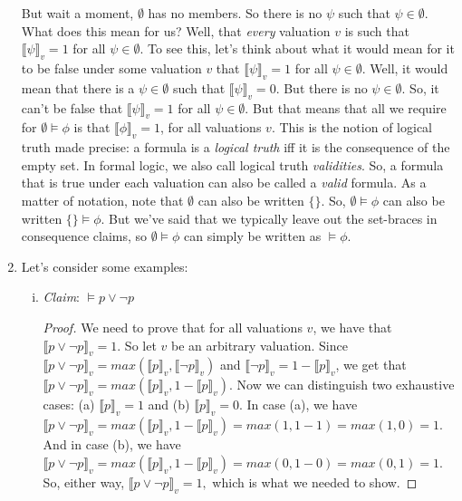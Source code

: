 \begin{enumerate}[\thesection.1]
\begin{itemize}
	\end{itemize}
But wait a moment, $\emptyset$ has no members. So there is no $\psi$ such that $\psi\in \emptyset$. What does this mean for us? Well, that \emph{every} valuation $v$ is such that $\llbracket\psi\rrbracket_v=1$ for all $\psi\in\emptyset$. To see this, let's think about what it would mean for it to be false under some valuation $v$ that $\llbracket\psi\rrbracket_v=1$ for all $\psi\in\emptyset$. Well, it would mean that there is a $\psi\in\emptyset$ such that $\llbracket\psi\rrbracket_v=0$. But there is no $\psi\in\emptyset$. So, it can't be false that $\llbracket\psi\rrbracket_v=1$ for all $\psi\in\emptyset$. But that means that all we require for $\emptyset\vDash\phi$ is that $\llbracket\phi\rrbracket_v=1$, for all valuations $v$. This is the notion of logical truth made precise: a formula is a \emph{logical truth} iff it is the consequence of the empty set. In formal logic, we also call logical truth \emph{validities}. So, a formula that is true under each valuation can also be called a \emph{valid} formula. As a matter of notation, note that $\emptyset$ can also be written $\{\}$. So, $\emptyset\vDash\phi$ can also be written $\{\}\vDash\phi$. But we've said that we typically leave out the set-braces in consequence claims, so $\emptyset\vDash\phi$ can simply be written as $\vDash\phi$.

	\item Let's consider some examples:
		
		\begin{enumerate}[(i)]
		
			\item \emph{Claim}: $\vDash p\lor\neg p$
		
			\begin{proof}
			We need to prove that for all valuations $v$, we have that $\llbracket
			p\lor\neg p\rrbracket_v=1$. So let $v$ be an arbitrary valuation. Since
			$\llbracket p\lor\neg p\rrbracket_v=max(\llbracket
			p\rrbracket_v,\llbracket\neg p\rrbracket_v)$ and $\llbracket \neg
			p\rrbracket_v=1-\llbracket p\rrbracket_v$, we get that $\llbracket
			p\lor\neg p\rrbracket_v=max(\llbracket p\rrbracket_v,1-\llbracket
			p\rrbracket_v)$. Now we can distinguish two exhaustive cases: (a)
			$\llbracket p\rrbracket_v=1$ and (b) $\llbracket p\rrbracket_v=0$. In
			case (a), we have $\llbracket p\lor\neg p\rrbracket_v=max(\llbracket
			p\rrbracket_v,1-\llbracket p\rrbracket_v)=max(1,1-1)=max(1,0)=1$. And in
			case (b), we have $\llbracket p\lor\neg p\rrbracket_v=max(\llbracket
			p\rrbracket_v,1-\llbracket p\rrbracket_v)=max(0, 1-0)=max(0,1)=1$. So,
			either way, $\llbracket p\lor\neg p\rrbracket_v=1,$ which is what we
			needed to show.
			\end{proof}
			

\end{enumerate}
\end{enumerate}
